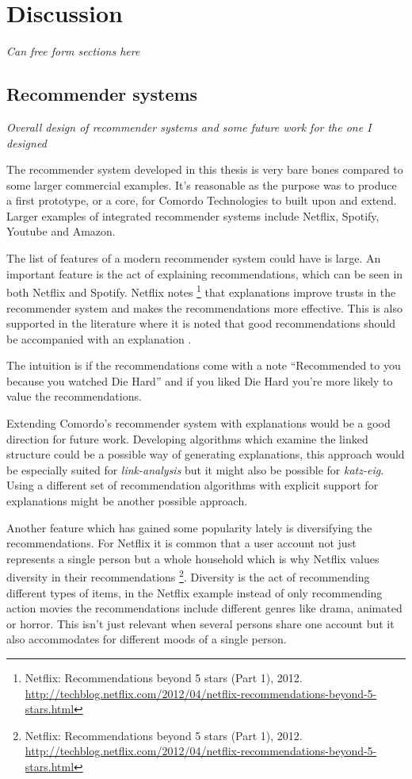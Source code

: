 \chapter{Discussion}\label{cha:discussion}

\textit{Can free form sections here}

\section{Recommender systems}

\textit{Overall design of recommender systems and some future work for the one I designed}

The recommender system developed in this thesis is very bare bones compared to some larger commercial examples. It's reasonable as the purpose was to produce a first prototype, or a core, for Comordo Technologies to built upon and extend.  Larger examples of integrated recommender systems include Netflix, Spotify, Youtube and Amazon.

The list of features of a modern recommender system could have is large. An important feature is the act of explaining recommendations, which can be seen in both Netflix and Spotify. Netflix notes
\footnote{
Netflix: Recommendations beyond 5 stars (Part 1), 2012.
\url{http://techblog.netflix.com/2012/04/netflix-recommendations-beyond-5-stars.html}
}
that explanations improve trusts in the recommender system and makes the recommendations more effective. This is also supported in the literature where it is noted that good recommendations should be accompanied with an explanation \citep{hu2008collaborative}.

The intuition is if the recommendations come with a note ``Recommended to you because you watched Die Hard'' and if you liked Die Hard you're more likely to value the recommendations.

Extending Comordo's recommender system with explanations would be a good direction for future work. Developing algorithms which examine the linked structure could be a possible way of generating explanations, this approach would be especially suited for \textit{link-analysis} but it might also be possible for \textit{katz-eig}. Using a different set of recommendation algorithms with explicit support for explanations might be another possible approach.

Another feature which has gained some popularity lately \citep{bobadilla2013recommender} is diversifying the recommendations. For Netflix it is common that a user account not just represents a single person but a whole household which is why Netflix values diversity in their recommendations
\footnote{
Netflix: Recommendations beyond 5 stars (Part 1), 2012.
\url{http://techblog.netflix.com/2012/04/netflix-recommendations-beyond-5-stars.html}
}.
Diversity is the act of recommending different types of items, in the Netflix example instead of only recommending action movies the recommendations include different genres like drama, animated or horror. This isn't just relevant when several persons share one account but it also accommodates for different moods of a single person.

